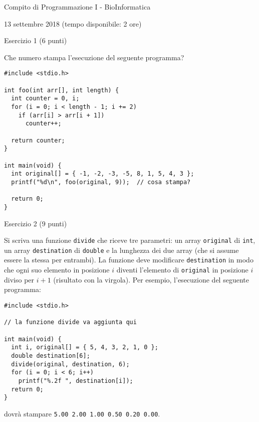 \documentclass[12pt]{article}
\begin{document}
\begin{center}{\LARGE Compito di Programmazione I - BioInformatica}\\
\vspace*{-2ex}
\begin{center}
  \large 13 settembre 2018 (tempo disponibile: 2 ore)
\end{center}
\end{center}

\begin{center}{\Large Esercizio 1} ($6$ punti)
\end{center}
Che numero stampa l'esecuzione del seguente programma?
\begin{lstlisting}
#include <stdio.h>

int foo(int arr[], int length) {
  int counter = 0, i;
  for (i = 0; i < length - 1; i += 2)
    if (arr[i] > arr[i + 1])
      counter++;

  return counter;
}

int main(void) {
  int original[] = { -1, -2, -3, -5, 8, 1, 5, 4, 3 };
  printf("%d\n", foo(original, 9));  // cosa stampa?

  return 0;
}
\end{lstlisting}

\vspace*{1ex}
\begin{center}{\Large Esercizio 2} ($9$ punti)
\end{center}
Si scriva una funzione \texttt{divide} che riceve tre parametri: un array
\texttt{original} di \texttt{int}, un array \texttt{destination} di \texttt{double}
e la lunghezza dei due array (che si assume essere la stessa per entrambi).
La funzione deve modificare \texttt{destination} in modo che ogni suo elemento
in posizione $i$ diventi l'elemento di \texttt{original} in posizione $i$
diviso per $i + 1$ (risultato con la virgola). Per esempio, l'esecuzione
del seguente programma:

\begin{lstlisting}
#include <stdio.h>

// la funzione divide va aggiunta qui

int main(void) {
  int i, original[] = { 5, 4, 3, 2, 1, 0 };
  double destination[6];
  divide(original, destination, 6);
  for (i = 0; i < 6; i++)
    printf("%.2f ", destination[i]);
  return 0;
}
\end{lstlisting}
dovr\`a stampare \texttt{5.00 2.00 1.00 0.50 0.20 0.00}.
\newpage
\end{document}
